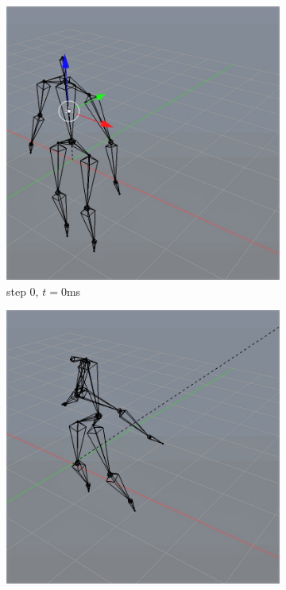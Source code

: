 \documentclass[10pt,twocolumn,letterpaper]{article}
\begin{document}
\begin{figure}
    \centering
    \begin{subfigure}{0.2\textwidth}
        \centering
        \includegraphics[width=.9\linewidth]{linear-cannon-0.jpg}
        \caption{step 0, $t=0$ms}
    \end{subfigure}\begin{subfigure}{0.2\textwidth}
        \centering
        \includegraphics[width=.9\linewidth]{linear-cannon-5.jpg}

\end{subfigure}
\end{figure}
\end{document}
